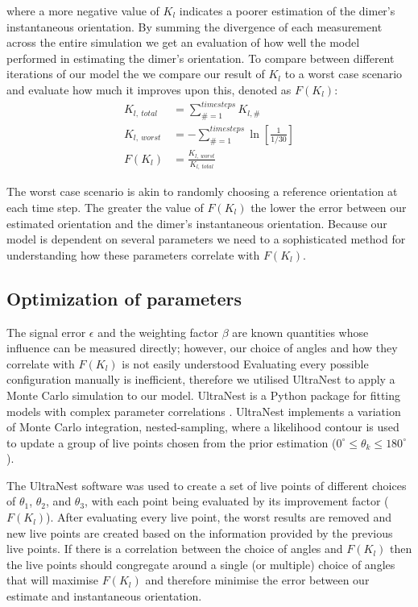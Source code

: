 \documentclass[final, 3p]{elsarticle}
\begin{document}
where a more negative value of $K_l$ indicates a poorer estimation of
the dimer's instantaneous orientation.  By summing the divergence of
each measurement across the entire simulation we get an evaluation of
how well the model performed in estimating the dimer's orientation.
To compare between different iterations of our model the we compare
our result of $K_l$ to a worst case scenario and evaluate how much it
improves upon this, denoted as $F(K_l)$:
\begin{align}
K_{l, \ total} &= \sum\limits_{\# =1}^{timesteps} K_{l,\#} \\
K_{l, \ worst} &= -\sum\limits_{\#=1}^{timesteps} \ln \left[\frac{1}{1/30} \right] \\
F(K_l) &= \frac{K_{l,\ worst}}{K_{l, \ total}}
\end{align}

The worst case scenario is akin to randomly choosing a reference
orientation at each time step. The greater the value of $F(K_l)$ the
lower the error between our estimated orientation and the dimer's
instantaneous orientation. Because our model is dependent on several
parameters we need to a sophisticated method for understanding how
these parameters correlate with $F(K_l)$.


\subsection{Optimization of parameters}
\label{sec:2.4}

The signal error $\epsilon$ and the weighting factor $\beta$ are known
quantities whose influence can be measured directly; however, our
choice of angles and how they correlate with $F(K_l)$ is not easily
understood Evaluating every possible configuration manually is
inefficient, therefore we utilised UltraNest to apply a Monte Carlo
simulation to our model.  UltraNest is a Python package for fitting
models with complex parameter correlations
\cite{Buchner2016Ultranest}.  UltraNest implements a variation of
Monte Carlo integration, nested-sampling, where a likelihood contour
is used to update a group of live points chosen from the prior
estimation ($0^{\circ} \leq \theta_k \leq 180^{\circ}$).

The UltraNest software was used to create a set of live points of
different choices of $\theta_1$, $\theta_2$, and $\theta_3$, with each
point being evaluated by its improvement factor ($F(K_l)$).  After
evaluating every live point, the worst results are removed and new
live points are created based on the information provided by the
previous live points.  If there is a correlation between the choice of
angles and $F(K_l)$ then the live points should congregate around a
single (or multiple) choice of angles that will maximise $F(K_l)$ and
therefore minimise the error between our estimate and instantaneous
orientation.
\end{document}
